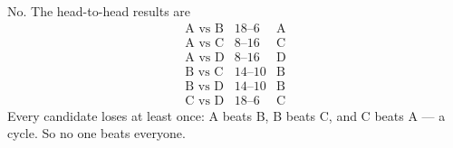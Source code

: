 \documentclass[12pt]{ximera}
\begin{document}
\begin{problem}
\begin{prompt}
\begin{feedback}
No. The head-to-head results are
\[
\begin{array}{lll}
\text{A vs B} & 18\text{--}6 & \text{A}\\
\text{A vs C} & 8\text{--}16 & \text{C}\\
\text{A vs D} & 8\text{--}16 & \text{D}\\
\text{B vs C} & 14\text{--}10 & \text{B}\\
\text{B vs D} & 14\text{--}10 & \text{B}\\
\text{C vs D} & 18\text{--}6 & \text{C}
\end{array}
\]
Every candidate loses at least once: A beats B, B beats C, and C beats A --- a cycle.
So no one beats everyone.
\end{feedback}
\end{prompt}
\end{problem}
\end{document}
